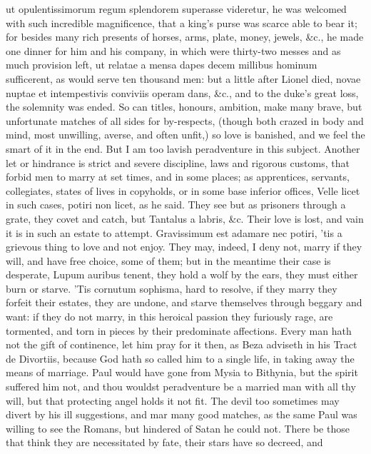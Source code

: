 {ut opulentissimorum regum splendorem superasse videretur, he was
welcomed with such incredible magnificence, that a king's purse was
scarce able to bear it; for besides many rich presents of horses, arms,
plate, money, jewels, \&c., he made one dinner for him and his company,
in which were thirty-two messes and as much provision left, ut relatae
a mensa dapes decem millibus hominum sufficerent, as would serve ten
thousand men: but a little after Lionel died, novae nuptae et
intempestivis conviviis operam dans, \&c., and to the duke's great loss,
the solemnity was ended. So can titles, honours, ambition, make many
brave, but unfortunate matches of all sides for by-respects, (though
both crazed in body and mind, most unwilling, averse, and often unfit,)
so love is banished, and we feel the smart of it in the end. But I am
too lavish peradventure in this subject.
Another let or hindrance is strict and severe discipline, laws and
rigorous customs, that forbid men to marry at set times, and in some
places; as apprentices, servants, collegiates, states of lives in
copyholds, or in some base inferior offices, Velle licet in such
cases, potiri non licet, as he said. They see but as prisoners through
a grate, they covet and catch, but Tantalus a labris, \&c. Their love is
lost, and vain it is in such an estate to attempt. Gravissimum
est adamare nec potiri, 'tis a grievous thing to love and not enjoy.
They may, indeed, I deny not, marry if they will, and have free choice,
some of them; but in the meantime their case is desperate, Lupum
auribus tenent, they hold a wolf by the ears, they must either burn or
starve. 'Tis cornutum sophisma, hard to resolve, if they marry they
forfeit their estates, they are undone, and starve themselves through
beggary and want: if they do not marry, in this heroical passion they
furiously rage, are tormented, and torn in pieces by their predominate
affections. Every man hath not the gift of continence, let him
pray for it then, as Beza adviseth in his Tract de Divortiis,
because God hath so called him to a single life, in taking away the
means of marriage. Paul would have gone from Mysia to Bithynia,
but the spirit suffered him not, and thou wouldst peradventure be a
married man with all thy will, but that protecting angel holds it not
fit. The devil too sometimes may divert by his ill suggestions, and mar
many good matches, as the same Paul was willing to see the
Romans, but hindered of Satan he could not. There be those that think
they are necessitated by fate, their stars have so decreed, and
}

